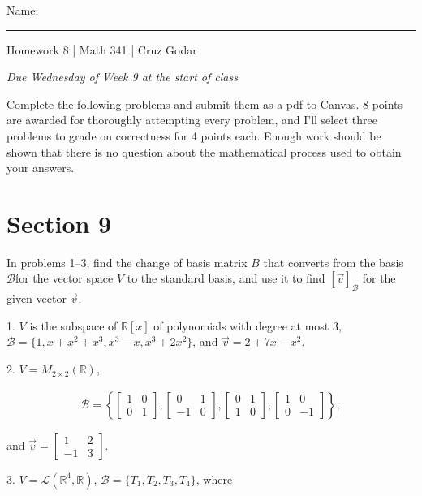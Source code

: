 \documentclass{article}
\begin{document}
\Large Name: \rule{2in}{0.15mm} \hfill Homework 8 | Math 341 | Cruz Godar \vspace{4pt}  \normalsize

\textit{Due Wednesday of Week 9 at the start of class}

Complete the following problems and submit them as a pdf to Canvas. 8 points are awarded for thoroughly attempting every problem, and I'll select three problems to grade on correctness for 4 points each. Enough work should be shown that there is no question about the mathematical process used to obtain your answers.

\section{Section 9}

In problems 1--3, find the change of basis matrix $B$ that converts from the basis $\mathcal{B}$for the vector space $V$ to the standard basis, and use it to find $[\vec{v}]_\mathcal{B}$ for the given vector $\vec{v}$.

1. $V$ is the subspace of $\mathbb{R}[x]$ of polynomials with degree at most $3$, $\mathcal{B} = \{1, x + x^2 + x^3, x^3 - x, x^3 + 2x^2\}$, and $\vec{v} = 2 + 7x - x^2$.

2. $V = M_{2 \times 2}(\mathbb{R})$,

\begin{align*}
	\mathcal{B} = \left\{ \left[\begin{array}{cc} 1& 0 \\ 0& 1 \end{array}\right], \left[\begin{array}{cc} 0& 1 \\ -1& 0 \end{array}\right], \left[\begin{array}{cc} 0& 1 \\ 1& 0 \end{array}\right], \left[\begin{array}{cc} 1& 0 \\ 0& -1 \end{array}\right] \right\},
\end{align*}

and $\vec{v} = \left[\begin{array}{cc} 1& 2 \\ -1& 3 \end{array}\right]$.

3. $V = \mathcal{L}(\mathbb{R}^4, \mathbb{R})$, $\mathcal{B} = \{T_1, T_2, T_3, T_4\}$, where
\end{document}

